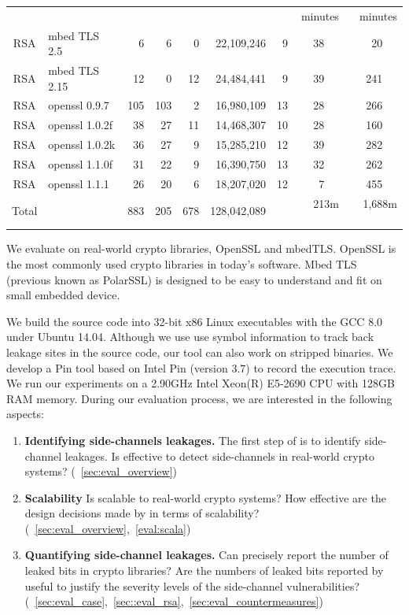 \begin{table}
\begin{tabular}{clrrrrrrr}
&&&&&&& minutes & minutes\\\cline{8-9}
RSA & mbed TLS 2.5   & 6 & 6 & 0 & 22,109,246 & 9      & 38 ~~& 20  ~~\\
RSA & mbed TLS 2.15  & 12 & 0 & 12 & 24,484,441 & 9    & 39 ~~& 241  ~~\\
RSA & openssl 0.9.7  & 105 & 103 & 2 & 16,980,109 & 13 & 28 ~~& 266 ~~\\
RSA & openssl 1.0.2f & 38 & 27 & 11 & 14,468,307 & 10  & 28 ~~& 160  ~~\\
RSA & openssl 1.0.2k & 36 & 27 & 9 & 15,285,210 & 12   & 39 ~~& 282   ~~\\
RSA & openssl 1.1.0f & 31 & 22 & 9 & 16,390,750 & 13   & 32 ~~& 262 ~~\\
RSA & openssl 1.1.1  & 26 & 20 & 6 & 18,207,020 & 12   &  7 ~~& 455 ~~\\\hline
Total &              & 883 &205& 678& 128,042,089&     & 213m    ~~& 1,688m ~~\\\hline
\end{tabular}
\end{table}

We evaluate \tool{} on real-world crypto libraries, 
OpenSSL and mbedTLS. 
OpenSSL is the most commonly used
crypto libraries in today's software. 
Mbed TLS (previous known as PolarSSL) is designed to 
be easy to understand and fit on small embedded device.


We build the source code into 32-bit x86 Linux executables with the 
GCC 8.0 under Ubuntu 14.04. Although we use use symbol information to track
back leakage sites in the source code, our tool can also
work on stripped binaries. We develop a Pin tool based on Intel Pin (version 3.7)
to record the execution trace. We run our experiments on a 2.90GHz
Intel Xeon(R) E5-2690 CPU with 128GB RAM memory.
During our evaluation process, we are interested in the following 
aspects:
\begin{enumerate}
    \item  \textbf{Identifying side-channels leakages.}
    The first step of \tool{} is to identify side-channel leakages. 
    Is \tool{} effective to detect side-channels in real-world
    crypto systems? (~\ref{sec:eval_overview})
    \item  \textbf{Scalability} 
    Is \tool{} scalable to real-world crypto systems?
    How effective are
    the design decisions made by \tool{} in terms of scalability?  
    (~\ref{sec:eval_overview},~\ref{eval:scala})
    \item  \textbf{Quantifying side-channel leakages.} 
    Can \tool{} precisely report the number of leaked bits in crypto libraries?
    Are the numbers of leaked bits reported by \tool{} useful to justify 
    the severity levels of the side-channel vulnerabilities? 
    (~\ref{sec:eval_case},~\ref{sec::eval_rsa},~\ref{sec:eval_countermeasures})
   
\end{enumerate}

